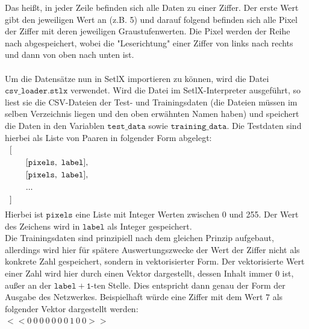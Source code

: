 Das heißt, in jeder Zeile befinden sich alle Daten zu einer Ziffer. Der erste Wert gibt den jeweiligen Wert an (z.B. 5) und darauf folgend befinden sich alle Pixel der Ziffer mit deren jeweiligen Graustufenwerten. Die Pixel werden der Reihe nach abgespeichert, wobei die "Leserichtung" einer Ziffer von links nach rechts und dann von oben nach unten ist.\\ \\
Um die Datensätze nun in SetlX importieren zu können, wird die Datei $\mathtt{csv\_loader.stlx}$ verwendet. Wird die Datei im SetlX-Interpreter ausgeführt, so liest sie die CSV-Dateien der Test- und Trainingsdaten (die Dateien müssen im selben Verzeichnis liegen und den oben erwähnten Namen haben) und speichert die Daten in den Variablen $\mathtt{test\_data}$ sowie $\mathtt{training\_data}$. Die Testdaten sind hierbei als Liste von Paaren in folgender Form abgelegt: \\
\hspace*{0.3cm}
$
\begin{array}[t]{lcll}
	[ \\[0.1cm]
	
	\hspace*{0.5cm}
	\begin{array}[t]{lcll}
    	[\mathtt{pixels},\ \mathtt{label}], \\[0.1cm]
    	[\mathtt{pixels},\ \mathtt{label}], \\[0.1cm]
    	... \\[0.1cm]
    \end{array}
    \\[0.1cm]
    
    ] \\[0.1cm]
\end{array}
$
\\[0.0cm]

\noindent
Hierbei ist $\mathtt{pixels}$ eine Liste mit Integer Werten zwischen 0 und 255. Der Wert des Zeichens wird in $\mathtt{label}$ als Integer gespeichert. \\ 
Die Trainingsdaten sind prinzipiell nach dem gleichen Prinzip aufgebaut, allerdings wird hier für spätere Auswertungszwecke der Wert der Ziffer nicht als konkrete Zahl gespeichert, sondern in vektorisierter Form. Der vektorisierte Wert einer Zahl wird hier durch einen Vektor dargestellt, dessen Inhalt immer 0 ist, außer an der $\mathtt{label+1}$-ten Stelle. Dies entspricht dann genau der Form der Ausgabe des Netzwerkes. Beispielhaft würde eine Ziffer mit dem Wert $7$ als folgender Vektor dargestellt werden: \\
$<<0\ 0\ 0\ 0\ 0\ 0\ 0\ 1\ 0\ 0>>$ \\

